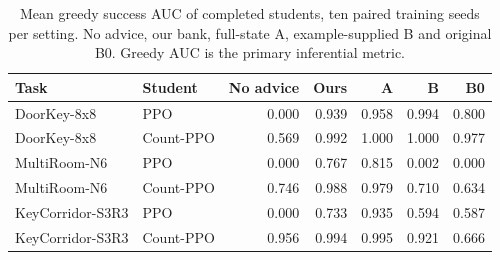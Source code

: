 \begin{table}[htbp]\centering\small

\caption{Mean greedy success AUC of completed students, ten paired training seeds per setting. No advice, our bank, full-state A, example-supplied B and original B0. Greedy AUC is the primary inferential metric.}

\label{tab:minigrid_teaching}

\begin{tabular}{@{}llrrrrr@{}}\toprule

Task & Student & No advice & Ours & A & B & B0\\\midrule

DoorKey-8x8 & PPO & 0.000 & 0.939 & 0.958 & 0.994 & 0.800\\

DoorKey-8x8 & Count-PPO & 0.569 & 0.992 & 1.000 & 1.000 & 0.977\\

MultiRoom-N6 & PPO & 0.000 & 0.767 & 0.815 & 0.002 & 0.000\\

MultiRoom-N6 & Count-PPO & 0.746 & 0.988 & 0.979 & 0.710 & 0.634\\

KeyCorridor-S3R3 & PPO & 0.000 & 0.733 & 0.935 & 0.594 & 0.587\\

KeyCorridor-S3R3 & Count-PPO & 0.956 & 0.994 & 0.995 & 0.921 & 0.666\\

\bottomrule\end{tabular}\end{table}

